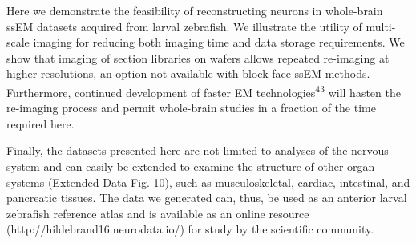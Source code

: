 \documentclass{article}
\begin{document}
Here we demonstrate the feasibility of reconstructing neurons in whole-brain ssEM datasets acquired from larval zebrafish. We illustrate the utility of multi-scale imaging for reducing both imaging time and data storage requirements. We show that imaging of section libraries on wafers allows repeated re-imaging at higher resolutions, an option not available with block-face ssEM methods. Furthermore, continued development of faster EM technologies\textsuperscript{43} will hasten the re-imaging process and permit whole-brain studies in a fraction of the time required here.

Finally, the datasets presented here are not limited to analyses of the nervous system and can easily be extended to examine the structure of other organ systems (Extended Data Fig. 10), such as musculoskeletal, cardiac, intestinal, and pancreatic tissues. The data we generated can, thus, be used as an anterior larval zebrafish reference atlas and is available as an online resource (http://hildebrand16.neurodata.io/) for study by the scientific community.


\end{document}
